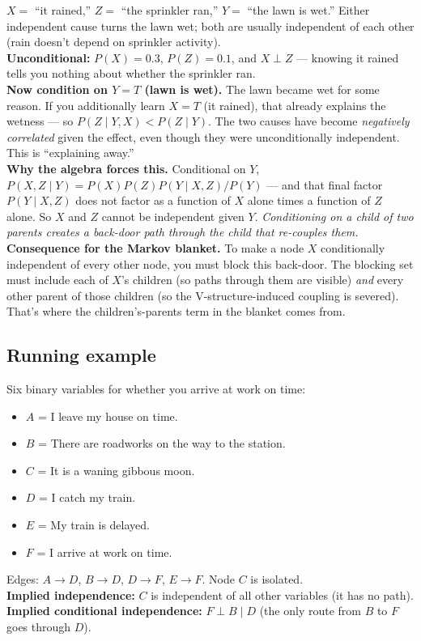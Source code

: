 \documentclass[11pt, a4paper]{article}
\begin{document}
\begin{exbox}
$X = $ ``it rained,'' $Z = $ ``the sprinkler ran,'' $Y = $ ``the lawn is wet.'' Either independent cause turns the lawn wet; both are usually independent of each other (rain doesn't depend on sprinkler activity).\\[0.3em]
\textbf{Unconditional:} $P(X) = 0.3$, $P(Z) = 0.1$, and $X \perp Z$ — knowing it rained tells you nothing about whether the sprinkler ran.\\[0.3em]
\textbf{Now condition on $Y = T$ (lawn is wet).} The lawn became wet for some reason. If you additionally learn $X = T$ (it rained), that already explains the wetness — so $P(Z \mid Y, X) < P(Z \mid Y)$. The two causes have become \emph{negatively correlated} given the effect, even though they were unconditionally independent. This is ``explaining away.''\\[0.3em]
\textbf{Why the algebra forces this.} Conditional on $Y$, $P(X, Z \mid Y) = P(X) P(Z) P(Y \mid X, Z) / P(Y)$ — and that final factor $P(Y \mid X, Z)$ does not factor as a function of $X$ alone times a function of $Z$ alone. So $X$ and $Z$ cannot be independent given $Y$. \emph{Conditioning on a child of two parents creates a back-door path through the child that re-couples them.}\\[0.3em]
\textbf{Consequence for the Markov blanket.} To make a node $X$ conditionally independent of every other node, you must block this back-door. The blocking set must include each of $X$'s children (so paths through them are visible) \emph{and} every other parent of those children (so the V-structure-induced coupling is severed). That's where the children's-parents term in the blanket comes from.
\end{exbox}

\subsection{Running example}

Six binary variables for whether you arrive at work on time:

\begin{exbox}
\begin{itemize}[itemsep=0pt, topsep=0pt]
  \item $A$ = I leave my house on time.
  \item $B$ = There are roadworks on the way to the station.
  \item $C$ = It is a waning gibbous moon.
  \item $D$ = I catch my train.
  \item $E$ = My train is delayed.
  \item $F$ = I arrive at work on time.
\end{itemize}
Edges: $A \to D$, $B \to D$, $D \to F$, $E \to F$. Node $C$ is isolated.\\[0.3em]
\textbf{Implied independence:} $C$ is independent of all other variables (it has no path).\\[0.3em]
\textbf{Implied conditional independence:} $F \perp B \mid D$ (the only route from $B$ to $F$ goes through $D$).
\end{exbox}
\end{document}
